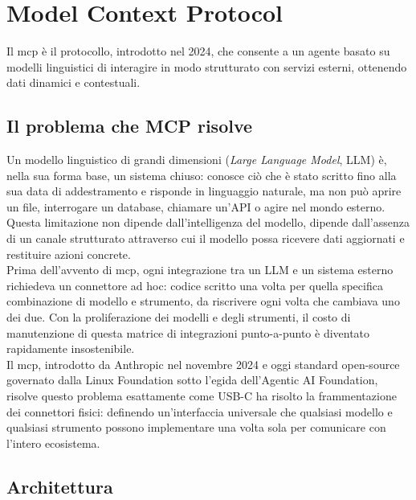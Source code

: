 \section{Model Context Protocol}
\label{sec:mcp-methodology}
Il \gls{mcp} è il protocollo, introdotto nel 2024, che consente a un agente basato su modelli
linguistici di interagire in modo strutturato con servizi esterni, ottenendo dati dinamici e
contestuali.

\subsection{Il problema che MCP risolve}

Un modello linguistico di grandi dimensioni (\emph{Large Language Model}, LLM) è, nella
sua forma base, un sistema chiuso: conosce ciò che è stato scritto fino alla sua data di
addestramento e risponde in linguaggio naturale, ma non può aprire un file, interrogare un
database, chiamare un'API o agire nel mondo esterno. Questa limitazione non dipende
dall'intelligenza del modello, dipende dall'assenza di un canale strutturato attraverso
cui il modello possa ricevere dati aggiornati e restituire azioni concrete.\\
Prima dell'avvento di \gls{mcp}, ogni integrazione tra un LLM e un sistema esterno richiedeva
un connettore ad hoc: codice scritto una volta per quella specifica combinazione di
modello e strumento, da riscrivere ogni volta che cambiava uno dei due. Con la
proliferazione dei modelli e degli strumenti, il costo di manutenzione di questa matrice
di integrazioni punto-a-punto è diventato rapidamente insostenibile.\\
Il \gls{mcp}, introdotto da Anthropic nel novembre 2024 e
oggi standard open-source governato dalla Linux Foundation sotto l'egida dell'Agentic AI
Foundation, risolve questo problema esattamente come USB-C ha risolto la frammentazione
dei connettori fisici: definendo un'interfaccia universale che qualsiasi modello e
qualsiasi strumento possono implementare una volta sola per comunicare con l'intero
ecosistema.

\subsection{Architettura}
\label{sec:mcp-architettura}

